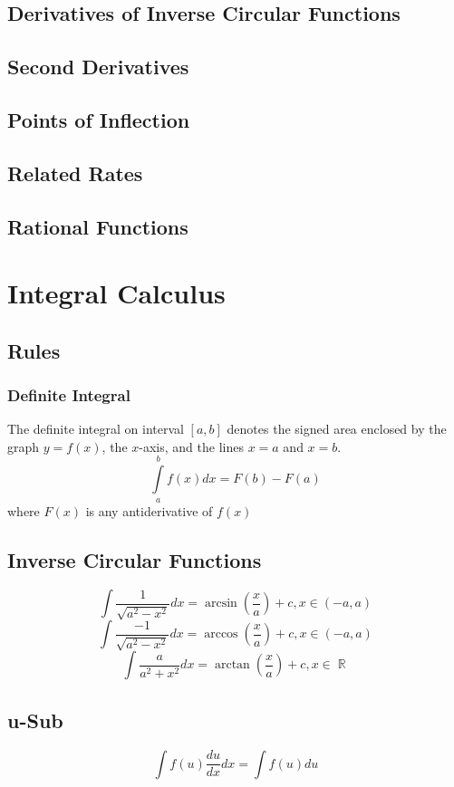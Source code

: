 \documentclass[a4paper,twoside,10pt]{article}
\DeclareMathOperator\R{\mathbb{R}}
\begin{document}
		\subsection{Derivatives of Inverse Circular Functions}
		\subsection{Second Derivatives}
		\subsection{Points of Inflection}
		\subsection{Related Rates}
		\subsection{Rational Functions}
	\section{Integral Calculus}
		\subsection{Rules}
			\subsubsection{Definite Integral}
				The definite integral on interval $[a,b]$ denotes the signed area enclosed by the graph $y=f(x)$, the $x$-axis, and the lines $x=a$ and $x=b$.
				\[
					\int\limits_{a}^{b}f(x)dx=F(b)-F(a)
				\]
				where $F(x)$ is any antiderivative of $f(x)$
		\subsection{Inverse Circular Functions}
			\[
				\int\frac{1}{\sqrt{a^2-x^2}}dx=\arcsin\left(\frac{x}{a}\right)+c,x\in(-a,a)
			\]
			\[
				\int\frac{-1}{\sqrt{a^2-x^2}}dx=\arccos\left(\frac{x}{a}\right)+c,x\in(-a,a)
			\]
			\[
				\int\frac{a}{a^2+x^2}dx=\arctan\left(\frac{x}{a}\right)+c,x\in\R
			\]
		\subsection{u-Sub}
			\[
				\int f(u)\frac{du}{dx}dx=\int f(u)du
			\]
\end{document}
